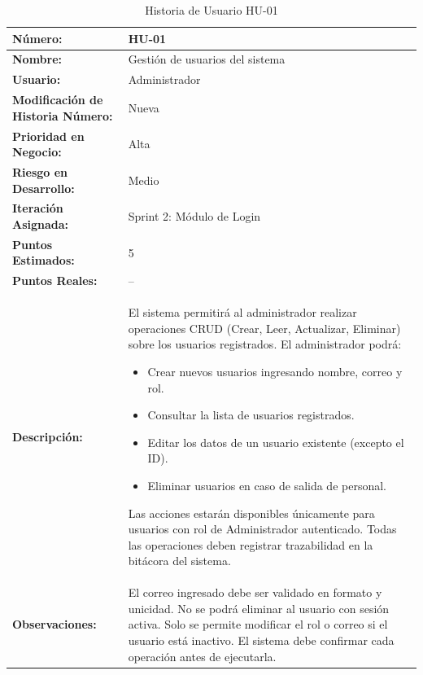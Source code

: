 \begin{table}[h]
	\centering
	\caption{Historia de Usuario HU-01}
	\begin{tabular}{|p{5cm}|p{9cm}|}
		\hline
		\textbf{Número:}                          & HU-01                           \\ \hline
		\textbf{Nombre:}                          & Gestión de usuarios del sistema \\ \hline
		\textbf{Usuario:}                         & Administrador                   \\ \hline
		\textbf{Modificación de Historia Número:} & Nueva                           \\ \hline
		\textbf{Prioridad en Negocio:}            & Alta                            \\ \hline
		\textbf{Riesgo en Desarrollo:}            & Medio                           \\ \hline
		\textbf{Iteración Asignada:}              & Sprint 2: Módulo de Login       \\ \hline
		\textbf{Puntos Estimados:}                & 5                               \\ \hline
		\textbf{Puntos Reales:}                   & --                              \\ \hline
		\textbf{Descripción:}                     &
		El sistema permitirá al administrador realizar operaciones CRUD (Crear, Leer, Actualizar, Eliminar) sobre los usuarios registrados.
		El administrador podrá:
		\begin{itemize}
			\item Crear nuevos usuarios ingresando nombre, correo y rol.
			\item Consultar la lista de usuarios registrados.
			\item Editar los datos de un usuario existente (excepto el ID).
			\item Eliminar usuarios en caso de salida de personal.
		\end{itemize}
		Las acciones estarán disponibles únicamente para usuarios con rol de Administrador autenticado. Todas las operaciones deben registrar trazabilidad en la bitácora del sistema.
		\\ \hline
		\textbf{Observaciones:}                   &
		El correo ingresado debe ser validado en formato y unicidad. No se podrá eliminar al usuario con sesión activa.
		Solo se permite modificar el rol o correo si el usuario está inactivo.
		El sistema debe confirmar cada operación antes de ejecutarla.
		\\ \hline
	\end{tabular}
\end{table}


